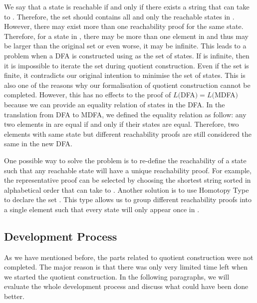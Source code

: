 \par We say that a state  is reachable if and
only if there exists a string  that can take  to
. Therefore, the set  should contains all and only the
reachable states in . However, there may exist more than one
reachability proof for the same state. Therefore, for a state in , there may be
more than one element in  and thus 
may be larger than the original set  or even worse, it may be
infinite. This leads to a problem when a DFA is constructed using
 as the set of states. If  is
infinite, then it is impossible to iterate the set during 
quotient construction. Even if the set  is finite, it
contradicts our original intention to minimise the set of states. This is also one of the
reasons why our formalisation of quotient construction cannot be
completed. However, this has no effects to the proof of \(L(\)DFA\() =
  L(\)MDFA\()\) because we can provide an equality relation of states in
the DFA. In the translation from DFA to MDFA, we defined
the equality relation as follow: any two elements in  are equal if and only
if their states are equal. Therefore, two elements with same state
but different reachability proofs are still considered the same in the new DFA. 

\par One possible way to solve the problem is to re-define the
reachability of a state such that any reachable state will have a
unique reachability proof. For example, the representative proof can
be selected by choosing the shortest string  sorted in
alphabetical order that can take  to . Another solution is to use
Homotopy Type to declare the set . This type allows us to
group different reachability proofs into a single element such that
every state will only appear once in . 


\subsection{Development Process}
\par As we have mentioned before, the parts related to quotient
construction were not completed. The major reason is
that there was only very limited time left when we started the quotient
construction. In the following paragraphs, we will evaluate the whole
development process and discuss what could have been done better. 

